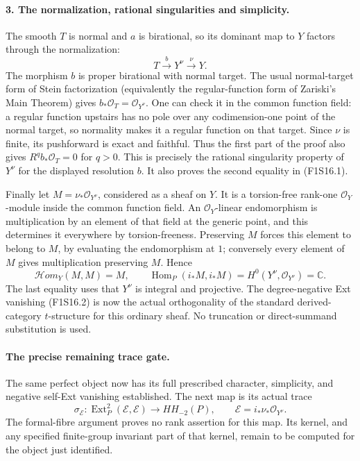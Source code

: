 \paragraph{3. The normalization, rational singularities and simplicity.}
The smooth $T$ is normal and $a$ is birational, so its dominant map to
$Y$ factors through the normalization:
\[
          T\xrightarrow{b}Y^\nu\xrightarrow{\nu}Y.
 \tag{F1S16.7}
\]
The morphism $b$ is proper birational with normal target. The usual
normal-target form of Stein factorization (equivalently the
regular-function form of Zariski's Main Theorem) gives
$b_*\mathcal O_T=\mathcal O_{Y^\nu}$. One can check it in the common
function field: a regular function upstairs has no pole over any
codimension-one point of the normal target, so normality makes it a
regular function on that target. Since $\nu$ is finite, its pushforward
is exact and faithful. Thus the first part of the proof also gives
$R^qb_*\mathcal O_T=0$ for $q>0$. This is precisely the rational
singularity property of $Y^\nu$ for the displayed resolution $b$.
It also proves the second equality in (F1S16.1).

Finally let $M=\nu_*\mathcal O_{Y^\nu}$, considered as a sheaf on $Y$.
It is a torsion-free rank-one $\mathcal O_Y$-module inside the common
function field. An $\mathcal O_Y$-linear endomorphism is multiplication
by an element of that field at the generic point, and this determines
it everywhere by torsion-freeness. Preserving $M$ forces this element
to belong to $M$, by evaluating the endomorphism at $1$; conversely
every element of $M$ gives multiplication preserving $M$. Hence
\[
       \mathcal H om_Y(M,M)=M,\qquad
       \operatorname{Hom}_P(i_*M,i_*M)
          =H^0(Y^\nu,\mathcal O_{Y^\nu})=\mathbb C.
\]
The last equality uses that $Y^\nu$ is integral and projective.
The degree-negative Ext vanishing (F1S16.2) is now the actual
orthogonality of the standard derived-category $t$-structure for this
ordinary sheaf. No truncation or direct-summand substitution is used.

\paragraph{The precise remaining trace gate.}
The same perfect object now has its full prescribed character,
simplicity, and negative self-Ext vanishing established. The next map
is its actual trace
\[
 \sigma_{\mathcal E}:\operatorname{Ext}^2_P(\mathcal E,\mathcal E)
                                      \longrightarrow HH_{-2}(P),
 \qquad\mathcal E=i_*\nu_*\mathcal O_{Y^\nu}.
 \tag{F1S16.8}
\]
The formal-fibre argument proves no rank assertion for this map.
Its kernel, and any specified finite-group invariant part of that
kernel, remain to be computed for the object just identified.
